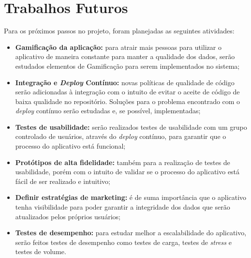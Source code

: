 \section{Trabalhos Futuros}

Para os próximos passos no projeto, foram planejadas as seguintes atividades:

\begin{itemize}
	\item \textbf{Gamificação da aplicação:} para atrair mais pessoas para utilizar o aplicativo de maneira constante para manter a qualidade dos dados, serão estudados elementos de Gamificação para serem implementados no sistema;
    \item \textbf{Integração e \textit{Deploy} Contínuo:} novas políticas de qualidade de código serão adicionadas à integração com o intuito de evitar o aceite de código de baixa qualidade no repositório. Soluções para o problema encontrado com o \textit{deploy} contínuo serão estudadas e, se possível, implementadas;
    \item \textbf{Testes de usabilidade:} serão realizados testes de usabilidade com um grupo controlado de usuários, através do \textit{deploy} contínuo, para garantir que o processo do aplicativo está funcional;
    \item \textbf{Protótipos de alta fidelidade:} também para a realização de testes de usabilidade, porém com o intuito de validar se o processo do aplicativo está fácil de ser realizado e intuitivo;
    \item \textbf{Definir estratégias de marketing:} é de suma importância que o aplicativo tenha visibilidade para poder garantir a integridade dos dados que serão atualizados pelos próprios usuários;
    \item \textbf{Testes de desempenho:} para estudar melhor a escalabilidade do aplicativo, serão feitos testes de desempenho como testes de carga, testes de \textit{stress} e testes de volume.
\end{itemize}
